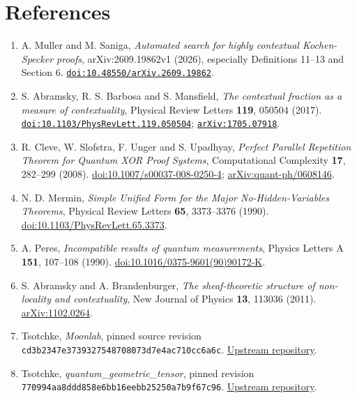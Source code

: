 \documentclass[10pt,a4paper]{article}
\providecommand{\tightlist}{\setlength{\itemsep}{0pt}\setlength{\parskip}{0pt}}
\begin{document}
\section{References}\label{references}
{\sloppy
\begin{enumerate}
\def\labelenumi{\arabic{enumi}.}
\tightlist
\item
  A. Muller and M. Saniga, \emph{Automated search for highly contextual Kochen-Specker proofs}, arXiv:2609.19862v1 (2026), especially Definitions 11--13 and Section 6. \href{https://doi.org/10.48550/arXiv.2609.19862}{\nolinkurl{doi:10.48550/arXiv.2609.19862}}.
\item
  S. Abramsky, R. S. Barbosa and S. Mansfield, \emph{The contextual fraction as a measure of contextuality}, Physical Review Letters \textbf{119}, 050504 (2017). \href{https://doi.org/10.1103/PhysRevLett.119.050504}{\nolinkurl{doi:10.1103/PhysRevLett.119.050504}}; \href{https://arxiv.org/abs/1705.07918}{\nolinkurl{arXiv:1705.07918}}.
\item
  R. Cleve, W. Slofstra, F. Unger and S. Upadhyay, \emph{Perfect Parallel Repetition Theorem for Quantum XOR Proof Systems}, Computational Complexity \textbf{17}, 282--299 (2008). \href{https://doi.org/10.1007/s00037-008-0250-4}{doi:10.1007/s00037-008-0250-4}; \href{https://arxiv.org/abs/quant-ph/0608146}{arXiv:quant-ph/0608146}.
\item
  N. D. Mermin, \emph{Simple Unified Form for the Major No-Hidden-Variables Theorems}, Physical Review Letters \textbf{65}, 3373--3376 (1990). \href{https://doi.org/10.1103/PhysRevLett.65.3373}{doi:10.1103/PhysRevLett.65.3373}.
\item
  A. Peres, \emph{Incompatible results of quantum measurements}, Physics Letters A \textbf{151}, 107--108 (1990). \href{https://doi.org/10.1016/0375-9601(90)90172-K}{doi:10.1016/0375-9601(90)90172-K}.
\item
  S. Abramsky and A. Brandenburger, \emph{The sheaf-theoretic structure of non-locality and contextuality}, New Journal of Physics \textbf{13}, 113036 (2011). \href{https://arxiv.org/abs/1102.0264}{arXiv:1102.0264}.
\item
  Tsotchke, \emph{Moonlab}, pinned source revision \texttt{cd3b2347e3739327548708073d7e4ac710cc6a6c}. \href{https://github.com/tsotchke/moonlab}{Upstream repository}.
\item
  Tsotchke, \emph{quantum\_geometric\_tensor}, pinned revision \texttt{770994aa8ddd858e6bb16eebb25250a7b9f67c96}. \href{https://github.com/tsotchke/quantum_geometric_tensor}{Upstream repository}.

\end{enumerate}}
\end{document}
